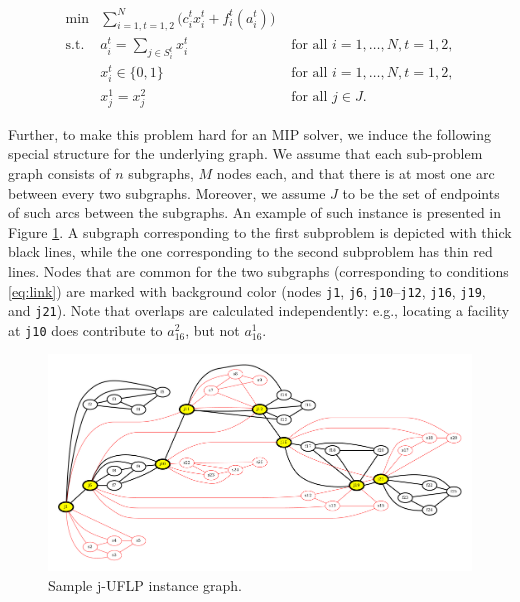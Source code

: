 \documentclass[11pt]{article}
\begin{document}
\begin{subequations}\label{eq:j-UFLP}
\begin{align}\tag{j-UFLP}
  \min & \sum_{i=1, t=1,2}^N \Big(c^t_i x^t_i + f^t_i(a^t_i)\Big)&\\
    \textrm{s.t. } & a^t_i = \sum_{j\in S^t_i} x^t_i& \textrm{ for all } i=1,\ldots, N, t=1,2,\\
    & x^t_i\in\{0,1\} & \textrm{ for all } i=1,\ldots,N, t=1,2,\\
    & x^1_j = x^2_j & \textrm{ for all } j\in J.\label{eq:link}
\end{align}
\end{subequations}

Further, to make this problem hard for an MIP solver, we induce the following
special structure for the underlying graph. We assume that each sub-problem
graph consists of \(n\) subgraphs, \(M\) nodes each, and that there is at most one
arc between every two subgraphs. Moreover, we assume \(J\) to be the set of
endpoints of such arcs between the subgraphs. An example of such instance is
presented in Figure \ref{fig:sample-jUFLP}. A subgraph corresponding to the first
subproblem is depicted with thick black lines, while the one corresponding to
the second subproblem has thin red lines. Nodes that are common for the two
subgraphs (corresponding to conditions \eqref{eq:link}) are marked with background
color (nodes \texttt{j1}, \texttt{j6}, \texttt{j10}--\texttt{j12}, \texttt{j16}, \texttt{j19}, and \texttt{j21}). Note that
overlaps are calculated independently: e.g., locating a facility at \texttt{j10} does
contribute to \(a_{16}^2\), but not \(a_{16}^1\).

  \begin{figure}%
    \centering
    \includegraphics[width=\textwidth]{./sample_jUFLP.pdf}%
    \caption{Sample j-UFLP instance graph.}%
    \label{fig:sample-jUFLP}%
\end{figure}
\end{document}
